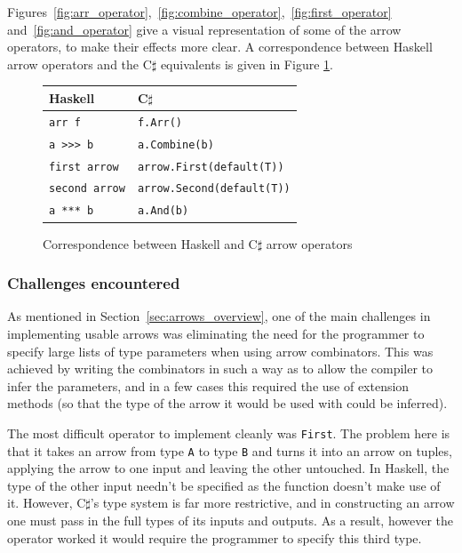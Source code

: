 \documentclass[12pt,twoside,notitlepage]{report}
\begin{document}
Figures~\ref{fig:arr_operator},~\ref{fig:combine_operator},~\ref{fig:first_operator} and~\ref{fig:and_operator} give a visual representation of some of the arrow operators, to make their effects more clear. A correspondence between Haskell arrow operators and the C$\sharp$ equivalents is given in Figure \ref{fig:operator_correspondence}.


\begin{figure}
\centering
\begin{tabular}{| l | l |}
\hline
Haskell & C$\sharp$ \\
\hline
\texttt {arr f} & \texttt{f.Arr()} \\
\texttt{a >>> b} & \texttt{a.Combine(b)} \\
\texttt{first arrow} & \texttt{arrow.First(default(T))} \\
\texttt{second arrow} & \texttt{arrow.Second(default(T))} \\
\texttt{a *** b} & \texttt{a.And(b)} \\
\hline
\end{tabular}
\caption{Correspondence between Haskell and C$\sharp$ arrow operators}
\label{fig:operator_correspondence}
\end{figure}

\subsubsection{Challenges encountered} \label{sec:simple_arrow_challenges}

As mentioned in Section~\ref{sec:arrows_overview}, one of the main challenges in implementing usable arrows was eliminating the need for the programmer to specify large lists of type parameters when using arrow combinators. This was achieved by writing the combinators in such a way as to allow the compiler to infer the parameters, and in a few cases this required the use of extension methods (so that the type of the arrow it would be used with could be inferred).

The most difficult operator to implement cleanly was \texttt{First}. The problem here is that it takes an arrow from type \texttt{A} to type \texttt{B} and turns it into an arrow on tuples, applying the arrow to one input and leaving the other untouched. In Haskell, the type of the other input needn't be specified as the function doesn't make use of it. However, C$\sharp$'s type system is far more restrictive, and in constructing an arrow one must pass in the full types of its inputs and outputs. As a result, however the operator worked it would require the programmer to specify this third type.
\end{document}
